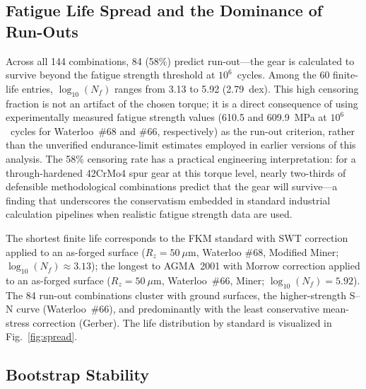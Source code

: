 \documentclass[twocolumn,12pt,a4paper]{article}
\begin{document}
\subsection{Fatigue Life Spread and the Dominance of Run-Outs}

Across all 144 combinations, 84 (58\%) predict run-out---the gear is
calculated to survive beyond the fatigue strength threshold at
$10^6$~cycles. Among the 60 finite-life entries, $\log_{10}(N_f)$
ranges from 3.13 to 5.92 (2.79~dex). This high censoring fraction is
not an artifact of the chosen torque; it is a direct consequence of
using experimentally measured fatigue strength values (610.5 and
609.9~MPa at $10^6$~cycles for Waterloo~\#68 and \#66, respectively)
as the run-out criterion, rather than the unverified endurance-limit
estimates employed in earlier versions of this analysis. The 58\%
censoring rate has a practical engineering interpretation: for a
through-hardened 42CrMo4 spur gear at this torque level, nearly
two-thirds of defensible methodological combinations predict that the
gear will survive---a finding that underscores the conservatism
embedded in standard industrial calculation pipelines when realistic
fatigue strength data are used.

The shortest finite life corresponds to the FKM standard with SWT
correction applied to an as-forged surface ($R_z=50~\mu$m, Waterloo
\#68, Modified Miner; $\log_{10}(N_f)\approx 3.13$); the longest to
AGMA~2001 with Morrow correction applied to an as-forged surface
($R_z=50~\mu$m, Waterloo~\#66, Miner; $\log_{10}(N_f)=5.92$). The 84
run-out combinations cluster with ground surfaces, the higher-strength
S--N curve (Waterloo~\#66), and predominantly with the least
conservative mean-stress correction (Gerber). The life distribution by
standard is visualized in Fig.~\ref{fig:spread}.

\subsection{Bootstrap Stability}
\end{document}
